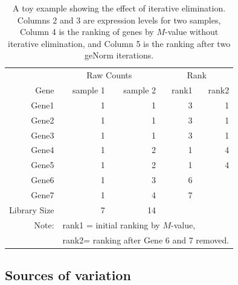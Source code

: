 \documentclass[11pt, a4paper]{article}
\begin{document}
 
\begin{table}[ht] \centering \caption{A toy example showing the effect of iterative elimination. Columns 2 and 3 are expression levels for two samples, Column 4 is the ranking of genes by $M$-value without iterative elimination, and Column 5 is the ranking after two geNorm iterations.} \begin{tabular}{rrrrr}
    \hline & \multicolumn{2}{c}{Raw Counts} & \multicolumn{2}{c}{Rank}\\
     Gene & sample 1 & sample 2 & rank1 & rank2 \\ \hline 
    Gene1 & 1 & 1 & 3 & 1 \\ 
    Gene2 & 1 & 1 & 3 & 1 \\ 
    Gene3 & 1 & 1 & 3 & 1 \\
     Gene4 & 1 & 2 & 1 & 4 \\ 
     Gene5 & 1 & 2 & 1 & 4 \\ 
     Gene6 & 1 & 3 & 6 &  \\ 
    Gene7 & 1 & 4 & 7 &  \\ \hline 
    Library Size & 7 & 14 & & 	\\ \hline 
    Note: &\multicolumn{4}{l}{ rank1 = initial ranking by $M$-value, } \\
    & \multicolumn{4}{l}{ rank2= ranking after Gene 6 and 7 removed.}
\end{tabular} \label{table:toyexample} \end{table}







\subsection{Sources of variation}\label{Section:varianceComp}
\end{document}
